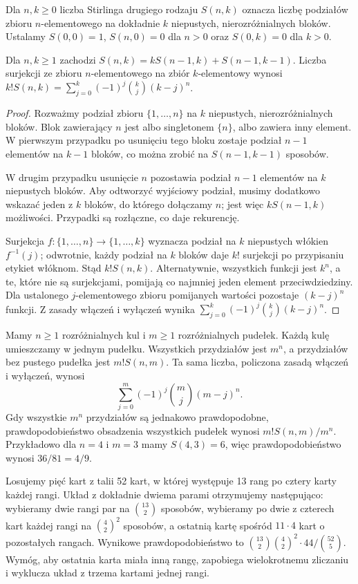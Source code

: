 \begin{definicja}
Dla $n,k\geq0$ liczba Stirlinga drugiego rodzaju $S(n,k)$ oznacza
liczbę podziałów zbioru $n$-elementowego na dokładnie $k$
niepustych, nierozróżnialnych bloków. Ustalamy $S(0,0)=1$,
$S(n,0)=0$ dla $n>0$ oraz $S(0,k)=0$ dla $k>0$.
\end{definicja}
\begin{stwierdzenie}
Dla $n,k\geq1$ zachodzi
$S(n,k)=kS(n-1,k)+S(n-1,k-1)$.
Liczba surjekcji ze zbioru $n$-elementowego na zbiór $k$-elementowy
wynosi $k!S(n,k)=\sum_{j=0}^k(-1)^j\binom kj(k-j)^n$.
\end{stwierdzenie}
\begin{proof}
Rozważmy podział zbioru $\{1,\ldots,n\}$ na $k$
niepustych, nierozróżnialnych bloków. Blok zawierający
$n$ jest albo singletonem $\{n\}$, albo zawiera inny
element. W pierwszym przypadku po usunięciu tego bloku
zostaje podział $n-1$ elementów na $k-1$ bloków,
co można zrobić na $S(n-1,k-1)$ sposobów.

W drugim przypadku usunięcie $n$ pozostawia podział
$n-1$ elementów na $k$ niepustych bloków. Aby odtworzyć
wyjściowy podział, musimy dodatkowo wskazać jeden z $k$
bloków, do którego dołączamy $n$; jest więc
$kS(n-1,k)$ możliwości. Przypadki są rozłączne,
co daje rekurencję.

Surjekcja $f:\{1,\ldots,n\}\to\{1,\ldots,k\}$
wyznacza podział na $k$ niepustych włókien
$f^{-1}(j)$; odwrotnie, każdy podział na $k$ bloków
daje $k!$ surjekcji po przypisaniu etykiet włóknom.
Stąd $k!S(n,k)$. Alternatywnie, wszystkich funkcji jest
$k^n$, a te, które nie są surjekcjami, pomijają co najmniej
jeden element przeciwdziedziny. Dla ustalonego
$j$-elementowego zbioru pomijanych wartości pozostaje
$(k-j)^n$ funkcji. Z zasady włączeń i wyłączeń wynika
$\sum_{j=0}^k(-1)^j\binom kj(k-j)^n$.
\end{proof}

\begin{przyklad}
Mamy $n\geq1$ rozróżnialnych kul i $m\geq1$ rozróżnialnych pudełek.
Każdą kulę umieszczamy w jednym pudełku. Wszystkich przydziałów
jest $m^n$, a przydziałów bez pustego pudełka jest $m!S(n,m)$.
Ta sama liczba, policzona zasadą włączeń i wyłączeń, wynosi
\[
\sum_{j=0}^{m}(-1)^j\binom mj(m-j)^n.
\]
Gdy wszystkie $m^n$ przydziałów są jednakowo prawdopodobne,
prawdopodobieństwo obsadzenia wszystkich pudełek wynosi
$m!S(n,m)/m^n$. Przykładowo dla $n=4$ i $m=3$
mamy $S(4,3)=6$, więc prawdopodobieństwo wynosi $36/81=4/9$.
\end{przyklad}

\begin{przyklad}
Losujemy pięć kart z talii 52 kart, w której występuje 13 rang
po cztery karty każdej rangi. Układ z dokładnie dwiema parami
otrzymujemy następująco: wybieramy dwie rangi par na $\binom{13}2$
sposobów, wybieramy po dwie z czterech kart każdej rangi
na $\binom42^2$ sposobów, a ostatnią kartę spośród
$11\cdot4$ kart o pozostałych rangach. Wynikowe
prawdopodobieństwo to
$\binom{13}2\binom42^2\cdot44/\binom{52}5$.
Wymóg, aby ostatnia karta miała inną rangę, zapobiega
wielokrotnemu zliczaniu i wyklucza układ z trzema
kartami jednej rangi.
\end{przyklad}

